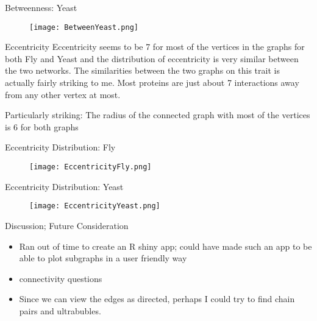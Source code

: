 \documentclass[xcolor=table]{beamer}
\begin{document}
\begin{frame}{Betweenness: Yeast}
    \begin{figure}[H]
\centering
\texttt{[image: BetweenYeast.png]}
\end{figure}
\end{frame}

\begin{frame}{Eccentricity}
    Eccentricity seems to be 7 for most of the vertices in the graphs for both Fly and Yeast and the distribution of eccentricity is very similar between the two networks. The similarities between the two graphs on this trait is actually fairly striking to me. Most proteins are just about 7 interactions away from any other vertex at most.
    
    Particularly striking: The radius of the connected graph with most of the vertices is 6 for both graphs
\end{frame}

\begin{frame}{Eccentricity Distribution: Fly}
\begin{figure}[H]
\centering
\texttt{[image: EccentricityFly.png]}
\end{figure}
\end{frame}


\begin{frame}{Eccentricity Distribution: Yeast}
\begin{figure}[H]
\centering
\texttt{[image: EccentricityYeast.png]}
\end{figure}
\end{frame}

\begin{frame}{Discussion; Future Consideration}
    \begin{itemize}
        \item Ran out of time to create an R shiny app; could have made such an app to be able to plot subgraphs in a user friendly way
        \item connectivity questions 
        \item Since we can view the edges as directed, perhaps I could try to find chain pairs and ultrabubles. 
        
    \end{itemize}
\end{frame}
\end{document}
